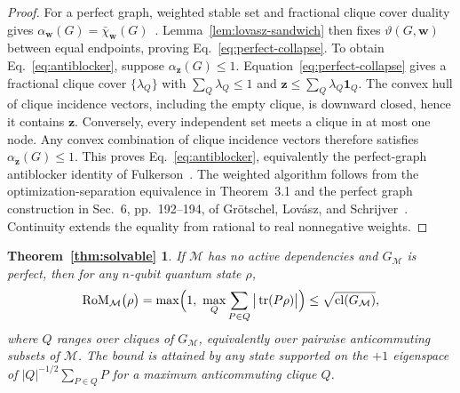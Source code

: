 \documentclass[10pt,aps,pra,twocolumn,floatfix,nofootinbib,superscriptaddress,longbibliography]{revtex4-2}
\newcommand{\Mcal}{\mathcal M}
\newcommand{\RoM}{\mathrm{RoM}}
\renewcommand{\tr}{\operatorname{tr}}
\providecommand{\mathbm}[1]{\bm{#1}}
\newtheorem*{theoremSolvableRestatement}{Theorem~\ref{thm:solvable}}
\begin{document}
\begin{bibunit}[apsrev4-2]
		\begin{proof}[Proof]
			For a perfect graph, weighted stable set and fractional clique cover duality gives $\alpha_{\mathbm{w}}(G)=\bar\chi_{\mathbm{w}}(G)$~\cite{lovasz1972normal,lovasz1972characterization,chvatal1975certain}. Lemma~\ref{lem:lovasz-sandwich} then fixes $\vartheta(G,\mathbm{w})$ between equal endpoints, proving Eq.~\eqref{eq:perfect-collapse}.
			To obtain Eq.~\eqref{eq:antiblocker}, suppose $\alpha_{\mathbm{z}}(G)\le1$. Equation~\eqref{eq:perfect-collapse} gives a fractional clique cover $\{\lambda_Q\}$ with $\sum_Q\lambda_Q\le1$ and $\mathbm{z}\le\sum_Q\lambda_Q\mathbm{1}_Q$. The convex hull of clique incidence vectors, including the empty clique, is downward closed, hence it contains $\mathbm{z}$.
			Conversely, every independent set meets a clique in at most one node. Any convex combination of clique incidence vectors therefore satisfies $\alpha_{\mathbm{z}}(G)\le1$. This proves Eq.~\eqref{eq:antiblocker}, equivalently the perfect-graph antiblocker identity of Fulkerson~\cite{fulkerson1971blocking,fulkerson1972antiblocking}.
			The weighted algorithm follows from the optimization-separation equivalence in Theorem~3.1 and the perfect graph construction in Sec.~6, pp.~192--194, of Gr\"otschel, Lov\'asz, and Schrijver~\cite{grotschel1981ellipsoid}. Continuity extends the equality from rational to real nonnegative weights.
		\end{proof}
		
		\begin{theoremSolvableRestatement}
			If $\Mcal$ has no active dependencies and $G_\Mcal$ is perfect, then for any $n$-qubit quantum state $\rho$,
			\begin{equation}
				\RoM_\Mcal\big(\rho\big)
				=
				\max\!\Big(1,\ \max_{Q} \sum_{P\in Q}\big|\tr(P\rho)\big| \Big)
				\le\sqrt{\clnum(G_\Mcal)},
				\label{eq:closed-form-app}
			\end{equation}
			where $Q$ ranges over cliques of $G_\Mcal$, equivalently over pairwise anticommuting subsets of $\Mcal$.
			The bound is attained by any state supported on the $+1$ eigenspace of $|Q|^{-1/2}\sum_{P\in Q}P$ for a maximum anticommuting clique $Q$.
		\end{theoremSolvableRestatement}
		

\end{bibunit}
\end{document}
